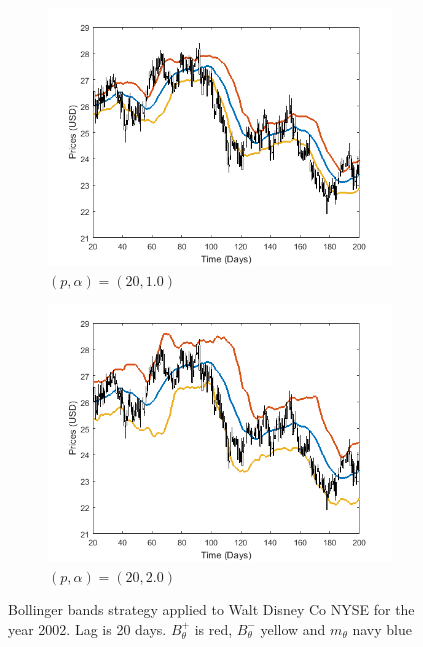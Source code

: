 \documentclass[11pt,a4,twosided,singlespacing,titlepagenumber=on]{scrreprt}
\numberwithin{equation}{chapter} %
\theoremstyle{remark}
\begin{document}
\begin{figure}[H]
    \centering
    \begin{subfigure}[t]{0.49\textwidth}
        \centering
        \includegraphics[width=1\textwidth]{bollinger/1}
        \caption{$(p, \alpha) = (20,1.0)$}
        \label{bollinger1}
    \end{subfigure}
    \begin{subfigure}[t]{0.49\textwidth}
        \centering
        \includegraphics[width=1\textwidth]{bollinger/2}
        \caption{$(p, \alpha) = (20,2.0)$}
        \label{bollinger2}
    \end{subfigure}
    \caption{Bollinger bands strategy applied to Walt Disney Co NYSE for the year 2002. Lag is 20 days. $B^+_\theta$ is red, $B^-_\theta$ yellow and $m_\theta$ navy blue}
    \label{bollinger_bands_intro}
\end{figure}
\end{document}
